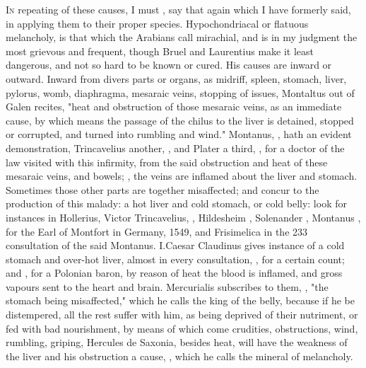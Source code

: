 \lettrine{I}{n} repeating of these causes, I must , say that again which I have formerly said, in applying them to their
proper species. Hypochondriacal or flatuous melancholy, is that which the
Arabians call mirachial, and is in my judgment the most grievous and frequent,
though Bruel and Laurentius make it least dangerous, and not so hard to be
known or cured. His causes are inward or outward. Inward from divers parts or
organs, as midriff, spleen, stomach, liver, pylorus, womb, diaphragma, mesaraic
veins, stopping of issues, \etc{} Montaltus  out
of Galen recites, "heat and obstruction of those mesaraic
veins, as an immediate cause, by which means the passage of the chilus to the
liver is detained, stopped or corrupted, and turned into rumbling and wind."
Montanus, , hath an evident demonstration,
Trincavelius another, , and Plater a
third, , for a doctor of the law visited
with this infirmity, from the said obstruction and heat of these mesaraic
veins, and bowels; ,
the veins are inflamed about the liver and stomach. Sometimes those other parts
are together misaffected; and concur to the production of this malady: a hot
liver and cold stomach, or cold belly: look for instances in Hollerius, Victor
Trincavelius, , Hildesheim
, Solenander
, Montanus
, for the Earl of Montfort in Germany, 1549,
and Frisimelica in the 233 consultation of the said Montanus. I.Caesar
Claudinus gives instance of a cold stomach and over-hot liver, almost in every
consultation, , for a certain count; and
, for a Polonian baron, by reason of heat the
blood is inflamed, and gross vapours sent to the heart and brain. Mercurialis
subscribes to them, , "the
stomach being misaffected," which he calls the king of the belly, because if he
be distempered, all the rest suffer with him, as being deprived of their
nutriment, or fed with bad nourishment, by means of which come crudities,
obstructions, wind, rumbling, griping, \etc{} Hercules de Saxonia, besides
heat, will have the weakness of the liver and his obstruction a cause,
, which he calls the mineral of melancholy.

